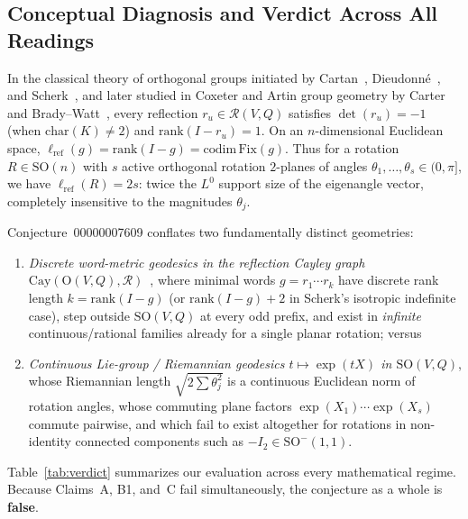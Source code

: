 \documentclass[11pt,a4paper]{article}
\theoremstyle{plain}
\theoremstyle{definition}
\newcommand{\Orth}{\mathrm{O}}
\newcommand{\SO}{\mathrm{SO}}
\newcommand{\Refl}{\mathcal{R}}
\newcommand{\lref}{\ell_{\mathrm{ref}}}
\newcommand{\rk}{\mathrm{rank}}
\newcommand{\Fix}{\mathrm{Fix}}
\begin{document}
\subsection{Conceptual Diagnosis and Verdict Across All Readings}
In the classical theory of orthogonal groups initiated by Cartan~\cite{Car38}, Dieudonn\'e~\cite{Die48}, and Scherk~\cite{Sch50}, and later studied in Coxeter and Artin group geometry by Carter~\cite{Car72} and Brady--Watt~\cite{BW02}, every reflection $r_u \in \Refl(V, Q)$ satisfies $\det(r_u) = -1$ (when $\mathrm{char}(K) \neq 2$) and $\rk(I - r_u) = 1$. On an $n$-dimensional Euclidean space, $\lref(g) = \rk(I - g) = \mathrm{codim}\,\Fix(g)$. Thus for a rotation $R \in \SO(n)$ with $s$ active orthogonal rotation $2$-planes of angles $\theta_1, \dots, \theta_s \in (0, \pi]$, we have $\lref(R) = 2s$: twice the $L^0$ support size of the eigenangle vector, completely insensitive to the magnitudes $\theta_j$.

Conjecture~00000007609 conflates two fundamentally distinct geometries:
\begin{enumerate}
\item \emph{Discrete word-metric geodesics in the reflection Cayley graph $\mathrm{Cay}(\Orth(V, Q), \Refl)$}~\cite{BW02}, where minimal words $g = r_1 \cdots r_k$ have discrete rank length $k = \rk(I - g)$ (or $\rk(I - g) + 2$ in Scherk's isotropic indefinite case), step outside $\SO(V, Q)$ at every odd prefix, and exist in \emph{infinite} continuous/rational families already for a single planar rotation; versus
\item \emph{Continuous Lie-group / Riemannian geodesics $t \mapsto \exp(t X)$ in $\SO(V, Q)$}, whose Riemannian length $\sqrt{2\sum \theta_j^2}$ is a continuous Euclidean norm of rotation angles, whose commuting plane factors $\exp(X_1)\cdots\exp(X_s)$ commute pairwise, and which fail to exist altogether for rotations in non-identity connected components such as $-I_2 \in \SO^-(1,1)$.
\end{enumerate}

Table~\ref{tab:verdict} summarizes our evaluation across every mathematical regime. Because Claims~A, B1, and~C fail simultaneously, the conjecture as a whole is \textbf{false}.
\end{document}
